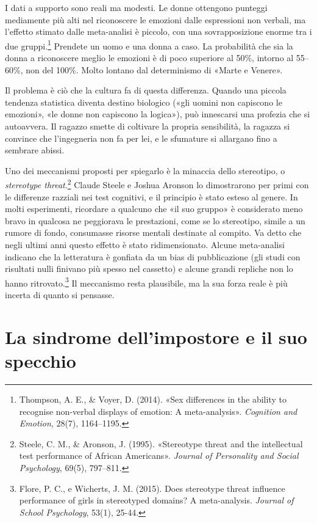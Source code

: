 I dati a supporto sono reali ma modesti. Le donne ottengono punteggi mediamente più alti nel riconoscere le emozioni dalle espressioni non verbali, ma l'effetto stimato dalle meta-analisi è piccolo, con una sovrapposizione enorme tra i due gruppi.\footnote{Thompson, A. E., \& Voyer, D. (2014). «Sex differences in the ability to recognise non-verbal displays of emotion: A meta-analysis». \textit{Cognition and Emotion}, 28(7), 1164--1195.} Prendete un uomo e una donna a caso. La probabilità che sia la donna a riconoscere meglio le emozioni è di poco superiore al 50\%, intorno al 55--60\%, non del 100\%. Molto lontano dal determinismo di «Marte e Venere».

Il problema è ciò che la cultura fa di questa differenza. Quando una piccola tendenza statistica diventa destino biologico («gli uomini non capiscono le emozioni», «le donne non capiscono la logica»), può innescarsi una profezia che si autoavvera. Il ragazzo smette di coltivare la propria sensibilità, la ragazza si convince che l'ingegneria non fa per lei, e le sfumature si allargano fino a sembrare abissi.

Uno dei meccanismi proposti per spiegarlo è la minaccia dello stereotipo, o \textit{stereotype threat}.\footnote{Steele, C. M., \& Aronson, J. (1995). «Stereotype threat and the intellectual test performance of African Americans». \textit{Journal of Personality and Social Psychology}, 69(5), 797--811.} Claude Steele e Joshua Aronson lo dimostrarono per primi con le differenze razziali nei test cognitivi, e il principio è stato esteso al genere. In molti esperimenti, ricordare a qualcuno che «il suo gruppo» è considerato meno bravo in qualcosa ne peggiorava le prestazioni, come se lo stereotipo, simile a un rumore di fondo, consumasse risorse mentali destinate al compito. Va detto che negli ultimi anni questo effetto è stato ridimensionato. Alcune meta-analisi indicano che la letteratura è gonfiata da un bias di pubblicazione (gli studi con risultati nulli finivano più spesso nel cassetto) e alcune grandi repliche non lo hanno ritrovato.\footnote{Flore, P. C., e Wicherts, J. M. (2015). Does stereotype threat influence performance of girls in stereotyped domains? A meta-analysis. \textit{Journal of School Psychology}, 53(1), 25-44.} Il meccanismo resta plausibile, ma la sua forza reale è più incerta di quanto si pensasse.

\section{La sindrome dell'impostore e il suo specchio}

